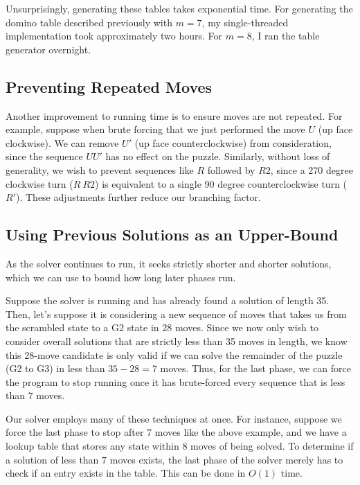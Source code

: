 \documentclass{article}
\begin{document}
Unsurprisingly, generating these tables takes exponential time. For generating the domino table described previously with $m=7$, my single-threaded implementation took approximately two hours. For $m=8$, I ran the table generator overnight.

\subsection{Preventing Repeated Moves}

Another improvement to running time is to ensure moves are not repeated. For example, suppose when brute forcing that we just performed the move $U$ (up face clockwise). We can remove $U'$ (up face counterclockwise) from consideration, since the sequence $U U'$ has no effect on the puzzle. Similarly, without loss of generality, we wish to prevent sequences like $R$ followed by $R2$, since a 270 degree clockwise turn ($R\ R2$) is equivalent to a single 90 degree counterclockwise turn ($R'$). These adjustments further reduce our branching factor.


\subsection{Using Previous Solutions as an Upper-Bound}

As the solver continues to run, it seeks strictly shorter and shorter solutions, which we can use to bound how long later phases run. 

Suppose the solver is running and has already found a solution of length 35. Then, let's suppose it is considering a new sequence of moves that takes us from the scrambled state to a G2 state in $28$ moves. Since we now only wish to consider overall solutions that are strictly less than 35 moves in length, we know this 28-move candidate is only valid if we can solve the remainder of the puzzle (G2 to G3) in less than $35-28 = 7$ moves. Thus, for the last phase, we can force the program to stop running once it has brute-forced every sequence that is less than $7$ moves.

Our solver employs many of these techniques at once. For instance, suppose we force the last phase to stop after $7$ moves like the above example, and we have a lookup table that stores any state within $8$ moves of being solved. To determine if a solution of less than $7$ moves exists, the last phase of the solver merely has to check if an entry exists in the table. This can be done in $O(1)$ time.
\end{document}
